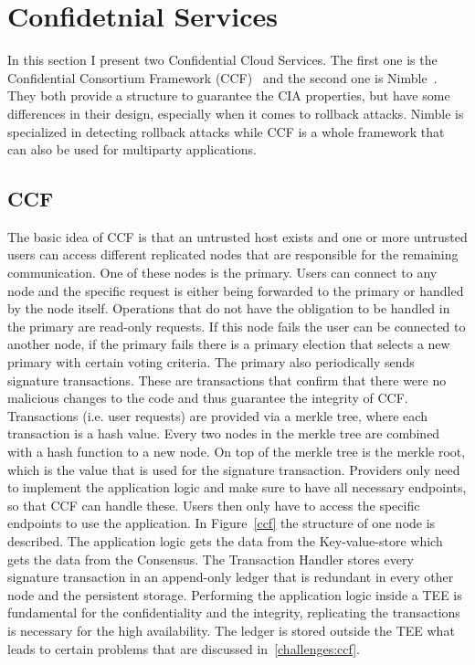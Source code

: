 \section{Confidetnial Services}
In this section I present two Confidential Cloud Services. The first one is the Confidential Consortium Framework (CCF)~\cite{Howard} and the second one is Nimble~\cite{Nimble}. They both provide a structure to guarantee the CIA properties, but have some differences in their design, especially when it comes to rollback attacks. Nimble is specialized in detecting rollback attacks while CCF is a whole framework that can also be used for multiparty applications.
\subsection{CCF}
The basic idea of CCF is that an untrusted host exists and one or more untrusted users can access different replicated nodes that are responsible for the remaining communication. One of these nodes is the primary. Users can connect to any node and the specific request is either being forwarded to the primary or handled by the node itself. Operations that do not have the obligation to be handled in the primary are read-only requests. If this node fails the user can be connected to another node, if the primary fails there is a primary election that selects a new primary with certain voting criteria. The primary also periodically sends signature transactions. These are transactions that confirm that there were no malicious changes to the code and thus guarantee the integrity of CCF. Transactions (i.e. user requests) are provided via a merkle tree, where each transaction is a hash value. Every two nodes in the merkle tree are combined with a hash function to a new node. On top of the merkle tree is the merkle root, which is the value that is used for the signature transaction. %
 Providers only need to implement the application logic and make sure to have all necessary endpoints, so that CCF can handle these. Users then only have to access the specific endpoints to use the application.  In Figure~\ref{ccf} the structure of one node is described. The application logic gets the data from the Key-value-store which gets the data from the Consensus. %
  The Transaction Handler stores every signature transaction in an append-only ledger that is redundant in every other node and the persistent storage. Performing the application logic inside a TEE is fundamental for the confidentiality and the integrity, replicating the transactions is necessary for the high availability. The ledger is stored outside the TEE what leads to certain problems that are discussed in~\ref{challenges:ccf}.
